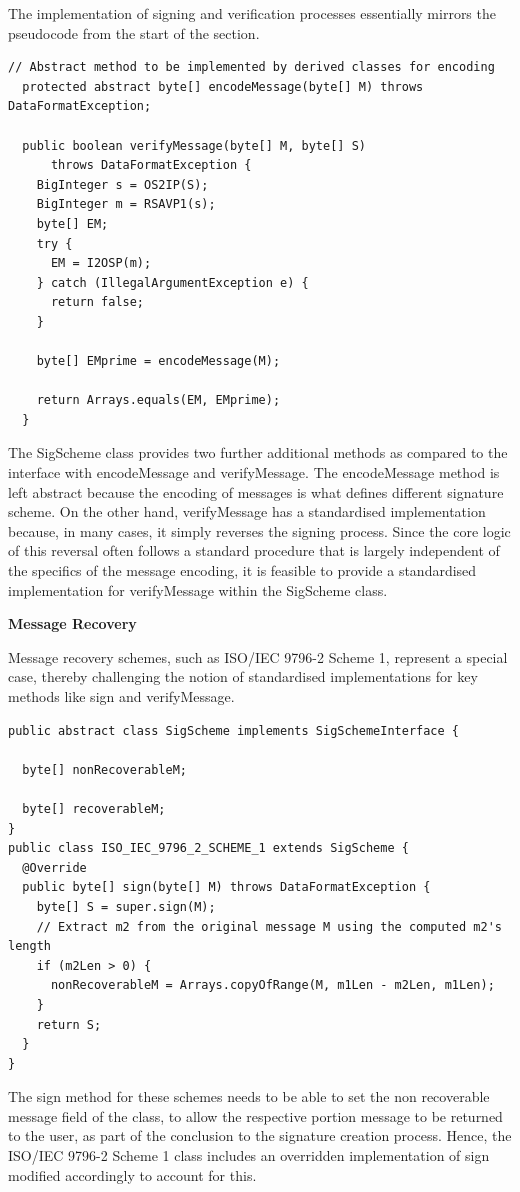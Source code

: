 \documentclass[]{final_report}
\theoremstyle{definition}
\begin{document}
The implementation of signing and verification processes essentially mirrors the pseudocode from the start of the section. 

\begin{lstlisting}[caption=Signature Scheme specialisation methods]
  // Abstract method to be implemented by derived classes for encoding
  protected abstract byte[] encodeMessage(byte[] M) throws DataFormatException;

  public boolean verifyMessage(byte[] M, byte[] S)
      throws DataFormatException {
    BigInteger s = OS2IP(S);
    BigInteger m = RSAVP1(s);
    byte[] EM;
    try {
      EM = I2OSP(m);
    } catch (IllegalArgumentException e) {
      return false;
    }

    byte[] EMprime = encodeMessage(M);

    return Arrays.equals(EM, EMprime);
  }
 \end{lstlisting}
 
The SigScheme class provides two further additional methods as compared to the interface with encodeMessage and verifyMessage. The encodeMessage method is left abstract because the encoding of messages is what defines different signature scheme. On the other hand, verifyMessage has a standardised implementation because, in many cases, it simply reverses the signing process. Since the core logic of this reversal often follows a standard procedure that is largely independent of the specifics of the message encoding, it is feasible to provide a standardised implementation for verifyMessage within the SigScheme class.

\textbf{Message Recovery}

Message recovery schemes, such as ISO/IEC 9796-2 Scheme 1, represent a special case, thereby challenging the notion of standardised implementations for key methods like sign and verifyMessage.
\begin{lstlisting}[caption=Implementation changes for Message Recovery Schemes]
public abstract class SigScheme implements SigSchemeInterface {

  byte[] nonRecoverableM;

  byte[] recoverableM;
}
public class ISO_IEC_9796_2_SCHEME_1 extends SigScheme {
  @Override
  public byte[] sign(byte[] M) throws DataFormatException {
    byte[] S = super.sign(M);
    // Extract m2 from the original message M using the computed m2's length
    if (m2Len > 0) {
      nonRecoverableM = Arrays.copyOfRange(M, m1Len - m2Len, m1Len);
    }
    return S;
  }
}
 \end{lstlisting}
The sign method for these schemes needs to be able to set the non recoverable message field of the class, to allow the respective portion message to be returned to the user, as part of the conclusion to the signature creation process. Hence, the ISO/IEC 9796-2 Scheme 1 class includes an overridden implementation of sign modified accordingly to account for this.
\end{document}
